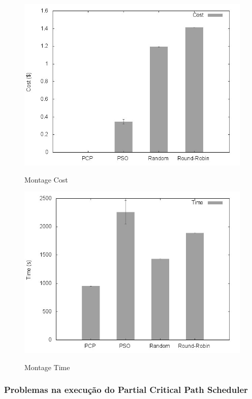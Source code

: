 \documentclass[a4paper,10pt]{article}
\begin{document}
\begin{figure}[!htb]

\centering

\includegraphics[scale=.55]{graphs/papermontage_cost.jpeg}
\label{montage_cost}
\caption{Montage Cost}

\includegraphics[scale=.55]{graphs/papermontage_time.jpeg}
\label{montage_time}
\caption{Montage Time}

\end{figure}


\subsubsection{Problemas na execução do Partial Critical Path Scheduler}
\label{ppppc}
\end{document}

